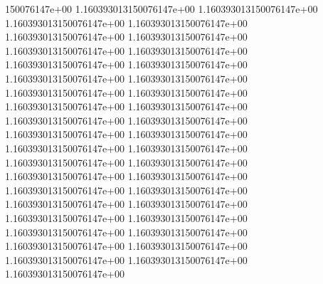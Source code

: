 150076147e+00	1.160393013150076147e+00	1.160393013150076147e+00	1.160393013150076147e+00	1.160393013150076147e+00	1.160393013150076147e+00	1.160393013150076147e+00	1.160393013150076147e+00	1.160393013150076147e+00	1.160393013150076147e+00	1.160393013150076147e+00	1.160393013150076147e+00	1.160393013150076147e+00	1.160393013150076147e+00	1.160393013150076147e+00	1.160393013150076147e+00	1.160393013150076147e+00	1.160393013150076147e+00	1.160393013150076147e+00	1.160393013150076147e+00	1.160393013150076147e+00	1.160393013150076147e+00	1.160393013150076147e+00	1.160393013150076147e+00	1.160393013150076147e+00	1.160393013150076147e+00	1.160393013150076147e+00	1.160393013150076147e+00	1.160393013150076147e+00	1.160393013150076147e+00	1.160393013150076147e+00	1.160393013150076147e+00	1.160393013150076147e+00	1.160393013150076147e+00	1.160393013150076147e+00	1.160393013150076147e+00	1.160393013150076147e+00	1.160393013150076147e+00	1.160393013150076147e+00	1.160393013150076147e+00
